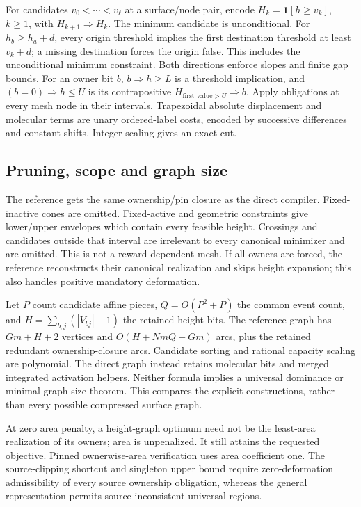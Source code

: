 \documentclass[10pt,letterpaper]{article}
\begin{document}
For candidates $v_0<\cdots<v_\ell$ at a surface/node pair, encode $H_k=\mathbf1[h\ge v_k]$, $k\ge1$, with $H_{k+1}\Rightarrow H_k$. The minimum candidate is unconditional. For $h_b\ge h_a+d$, every origin threshold implies the first destination threshold at least $v_k+d$; a missing destination forces the origin false. This includes the unconditional minimum constraint. Both directions enforce slopes and finite gap bounds. For an owner bit $b$, $b\Rightarrow h\ge L$ is a threshold implication, and $(b=0)\Rightarrow h\le U$ is its contrapositive $H_{\text{first value}>U}\Rightarrow b$. Apply obligations at every mesh node in their intervals. Trapezoidal absolute displacement and molecular terms are unary ordered-label costs, encoded by successive differences and constant shifts. Integer scaling gives an exact cut.

\subsection{Pruning, scope and graph size}
The reference gets the same ownership/pin closure as the direct compiler. Fixed-inactive cones are omitted. Fixed-active and geometric constraints give lower/upper envelopes which contain every feasible height. Crossings and candidates outside that interval are irrelevant to every canonical minimizer and are omitted. This is not a reward-dependent mesh. If all owners are forced, the reference reconstructs their canonical realization and skips height expansion; this also handles positive mandatory deformation.

Let $P$ count candidate affine pieces, $Q=O(P^2+P)$ the common event count, and $H=\sum_{b,j}(|V_{bj}|-1)$ the retained height bits. The reference graph has $Gm+H+2$ vertices and $O(H+NmQ+Gm)$ arcs, plus the retained redundant ownership-closure arcs. Candidate sorting and rational capacity scaling are polynomial. The direct graph instead retains molecular bits and merged integrated activation helpers. Neither formula implies a universal dominance or minimal graph-size theorem. This compares the explicit constructions, rather than every possible compressed surface graph.

At zero area penalty, a height-graph optimum need not be the least-area realization of its owners; area is unpenalized. It still attains the requested objective. Pinned ownerwise-area verification uses area coefficient one. The source-clipping shortcut and singleton upper bound require zero-deformation admissibility of every source ownership obligation, whereas the general representation permits source-inconsistent universal regions.
\end{document}
